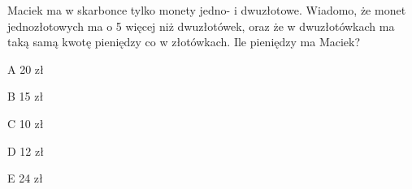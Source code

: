 \begin{tresc}
Maciek ma w skarbonce tylko monety jedno- i dwuzłotowe. Wiadomo, że monet jednozłotowych ma o 5 więcej niż dwuzłotówek, oraz że w dwuzłotówkach ma taką samą kwotę pieniędzy co w złotówkach. Ile pieniędzy ma Maciek?
\end{tresc}
\begin{wariant}{A} 20 zł \end{wariant}
\begin{wariant}{B} 15 zł \end{wariant}
\begin{wariant}{C} 10 zł \end{wariant}
\begin{wariant}{D} 12 zł \end{wariant}
\begin{wariant}{E} 24 zł \end{wariant}

